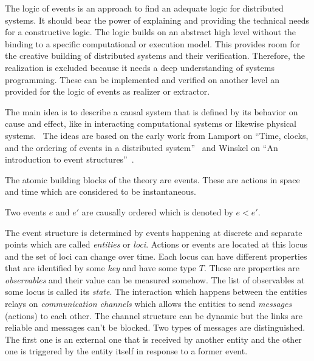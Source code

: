 The logic of events is an approach to find an adequate logic for distributed
systems. It should bear the power of explaining and providing the
technical needs for a constructive logic. The logic builds on an
abstract high level without the binding to a specific computational
or execution model. This provides room for the creative building
of distributed systems and their verification. Therefore, the realization
is excluded because it needs a deep understanding of systems programming.
These can be implemented and verified on another level an provided for
the logic of events as realizer or extractor.~\cite{bickford2005causal}

The main idea is to describe a causal system that is defined by its
behavior on cause and effect, like in interacting computational systems
or likewise physical systems.~\cite{bickford2005causal}
The ideas are based on the early work from Lamport on ``Time, clocks, and
the ordering of events in a distributed system''~\cite{lamport1978time}
and Winskel on ``An introduction to event
structures''~\cite{winskel1988introduction}.

The atomic building blocks of the theory are events. These are actions
in space and time which are considered to be instantaneous.

\begin{defi}
  Two events $e$ and $e'$ are causally ordered which is denoted by $e<e'$.
\end{defi}

The event structure is determined by events happening at discrete and separate
points which are called \textit{entities} or \textit{loci}. Actions or events
are located at this locus and the set of loci can change over time.
Each locus can have different properties that are identified by some
\textit{key} and have some type $T$. These are properties are
\textit{observables} and their value can be measured somehow.
The list of observables at some locus is called its \textit{state}.
The interaction which happens between the entities relays on
\textit{communication channels} which allows the entities to send
\textit{messages} (actions) to each other. The channel structure
can be dynamic but the links are reliable and messages can't be blocked.
Two types of messages are distinguished. The first one is an
external one that is received by another entity and the other one is triggered
by the entity itself in response to a former event.~\cite{bickford2005causal}

